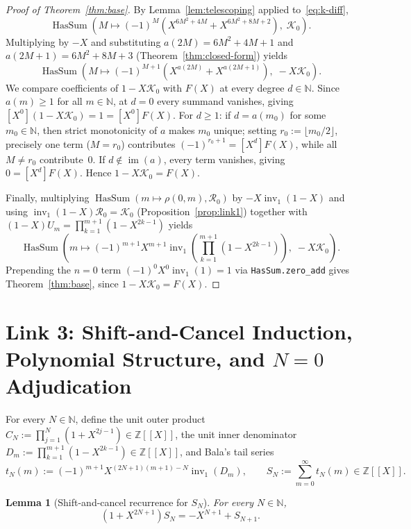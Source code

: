 \documentclass[11pt]{article}
\newcommand{\llbracket}{[\![}
\newcommand{\rrbracket}{]\!]}
\newtheorem{lemma}[theorem]{Lemma}
\theoremstyle{definition}
\newcommand{\N}{\mathbb{N}}
\newcommand{\Z}{\mathbb{Z}}
\newcommand{\inv}{\operatorname{inv}_1}
\begin{document}
\begin{proof}[Proof of Theorem~\ref{thm:base}]
By Lemma~\ref{lem:telescoping} applied to~\eqref{eq:k-diff},
\[
\operatorname{HasSum}\!\left(M \mapsto (-1)^M (X^{6M^2 + 4M} + X^{6M^2 + 8M + 2}),\; \mathcal{K}_0\right).
\]
Multiplying by $-X$ and substituting $a(2M) = 6M^2 + 4M + 1$ and $a(2M + 1) = 6M^2 + 8M + 3$ (Theorem~\ref{thm:closed-form}) yields
\[
\operatorname{HasSum}\!\left(M \mapsto (-1)^{M+1} (X^{a(2M)} + X^{a(2M+1)}),\; -X\mathcal{K}_0\right).
\]
We compare coefficients of $1 - X\mathcal{K}_0$ with $F(X)$ at every degree $d \in \N$. Since $a(m) \ge 1$ for all $m \in \N$, at $d = 0$ every summand vanishes, giving $[X^0](1 - X\mathcal{K}_0) = 1 = [X^0] F(X)$. For $d \ge 1$: if $d = a(m_0)$ for some $m_0 \in \N$, then strict monotonicity of $a$ makes $m_0$ unique; setting $r_0 := \lfloor m_0 / 2 \rfloor$, precisely one term ($M = r_0$) contributes $(-1)^{r_0 + 1} = [X^d] F(X)$, while all $M \ne r_0$ contribute~$0$. If $d \notin \operatorname{im}(a)$, every term vanishes, giving $0 = [X^d] F(X)$. Hence $1 - X\mathcal{K}_0 = F(X)$.

Finally, multiplying $\operatorname{HasSum}(m \mapsto \rho(0, m), \mathcal{R}_0)$ by $-X \inv(1 - X)$ and using $\inv(1 - X)\mathcal{R}_0 = \mathcal{K}_0$ (Proposition~\ref{prop:link1}) together with $(1 - X) U_m = \prod_{k=1}^{m+1} (1 - X^{2k-1})$ yields
\[
\operatorname{HasSum}\!\left(m \mapsto (-1)^{m+1} X^{m+1} \inv\!\left(\prod_{k=1}^{m+1}(1 - X^{2k-1})\right),\; -X\mathcal{K}_0\right).
\]
Prepending the $n = 0$ term $(-1)^0 X^0 \inv(1) = 1$ via \texttt{HasSum.zero\_add} gives Theorem~\ref{thm:base}, since $1 - X\mathcal{K}_0 = F(X)$.
\end{proof}

\section{Link 3: Shift-and-Cancel Induction, Polynomial Structure, and \texorpdfstring{$N = 0$}{N = 0} Adjudication}

For every $N \in \N$, define the unit outer product $C_N := \prod_{j=1}^N (1 + X^{2j-1}) \in \Z\llbracket X \rrbracket$, the unit inner denominator $D_m := \prod_{k=1}^{m+1} (1 - X^{2k-1}) \in \Z\llbracket X \rrbracket$, and Bala's tail series
\[
t_N(m) := (-1)^{m+1} X^{(2N+1)(m+1) - N} \inv(D_m), \qquad S_N := \sum_{m=0}^{\infty} t_N(m) \in \Z\llbracket X \rrbracket.
\]

\begin{lemma}[Shift-and-cancel recurrence for $S_N$]
\label{lem:shift-cancel}
For every $N \in \N$,
\begin{equation}
\label{eq:shift-cancel}
(1 + X^{2N+1}) S_N = -X^{N+1} + S_{N+1}.
\end{equation}
\end{lemma}
\end{document}
